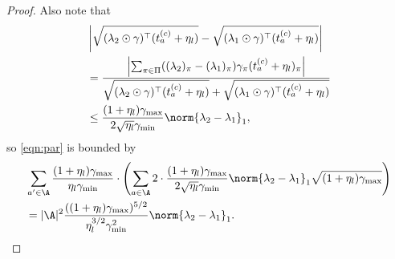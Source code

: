 \documentclass{article}
\newcommand{\1}{\mathbf{1}}
\begin{document}
\begin{proof}
Also note that 
\begin{align*}
    &\left|\sqrt{(\lambda_{2}\odot\gamma)^{\top} (t_{a}^{(c)}+\eta_l)}-\sqrt{(\lambda_{1}\odot\gamma)^{\top} (t_{a}^{(c)}+\eta_l)}\right|\\
    &= \frac{\left|\sum_{\pi\in\Pi}((\lambda_2)_\pi-(\lambda_1)_\pi)\gamma_\pi(t_a^{(c)}+\eta_l)_\pi\right|}{\sqrt{(\lambda_{2}\odot\gamma)^{\top} (t_{a}^{(c)}+\eta_l)}+\sqrt{(\lambda_{1}\odot\gamma)^{\top} (t_{a}^{(c)}+\eta_l)}}\\
    &\leq \frac{(1+\eta_l)\gamma_{\max}}{2\sqrt{\eta_l}\gamma_{\min}}\norm{\lambda_2-\lambda_1}_1,
\end{align*}
so \eqref{eqn:par} is bounded by 
\begin{align*}
    &\sum_{a^{\prime} \in \A}\frac{(1+\eta_l)\gamma_{\max}}{\eta_l\gamma_{\min}} \cdot\left(\sum_{a \in \A} 2\cdot\frac{(1+\eta_l)\gamma_{\max}}{2\sqrt{\eta_l}\gamma_{\min}}\norm{\lambda_2-\lambda_1}_1\sqrt{(1+\eta_l)\gamma_{\max}}\right)\\
    &=|\A|^2\frac{((1+\eta_l)\gamma_{\max})^{5/2}}{\eta_l^{3/2}\gamma_{\min}^2}\norm{\lambda_2-\lambda_1}_1.
\end{align*}
\end{proof}
\end{document}
